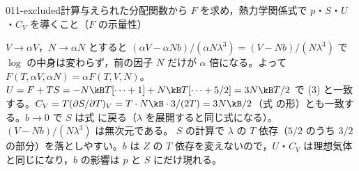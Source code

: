 \documentclass[uplatex,dvipdfmx,a4paper,11pt]{jsarticle}
\begin{document}
\begin{mondai}{011-excluded}{計算}{与えられた分配関数から $F$ を求め，熱力学関係式で $p$・$S$・$U$・$C_{V}$ を導くこと（$F$ の示量性）}
\begin{tadashii}
 $V\to\alpha V$，$N\to\alpha N$ とすると $(\alpha V-\alpha Nb)/(\alpha N\lambda^{3})=(V-Nb)/(N\lambda^{3})$ で $\log$ の中身は変わらず，前の因子 $N$ だけが $\alpha$ 倍になる。よって $F(T,\alpha V,\alpha N)=\alpha F(T,V,N)$。
\kenzan $U=F+TS=-N\kB T[\cdots+1]+N\kB T[\cdots+5/2]=3N\kB T/2$ で (3) と一致する。$C_{V}=T(\partial S/\partial T)_{V}=T\cdot N\kB\cdot3/(2T)=3N\kB/2$（式 の形）とも一致する。$b\to0$ で $S$ は式 に戻る（$\lambda$ を展開すると同じ式になる）。$(V-Nb)/(N\lambda^{3})$ は無次元である。
\tsumazuki $S$ の計算で $\lambda$ の $T$ 依存（$5/2$ のうち $3/2$ の部分）を落としやすい。$b$ は $Z$ の $T$ 依存を変えないので，$U$・$C_{V}$ は理想気体と同じになり，$b$ の影響は $p$ と $S$ にだけ現れる。
\end{tadashii}
\end{mondai}
\end{document}
